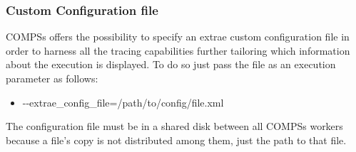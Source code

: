 \subsubsection{Custom Configuration file}

COMPSs offers the possibility to specify an extrae custom configuration file in order to harness all the tracing capabilities further tailoring which information about the execution is displayed. To do so just pass the file as an execution parameter as follows:
    
\begin{itemize}
 \item -{}-extrae\_config\_file=/path/to/config/file.xml
\end{itemize}

The configuration file must be in a shared disk between all COMPSs workers because a file's copy is not distributed among them, just the path to that file.


